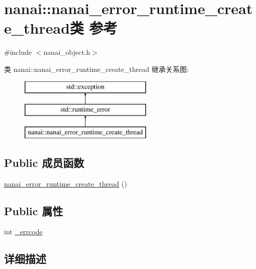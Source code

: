 \hypertarget{classnanai_1_1nanai__error__runtime__create__thread}{}\section{nanai\+:\+:nanai\+\_\+error\+\_\+runtime\+\_\+create\+\_\+thread类 参考}
\label{classnanai_1_1nanai__error__runtime__create__thread}


{\ttfamily \#include $<$nanai\+\_\+object.\+h$>$}

类 nanai\+:\+:nanai\+\_\+error\+\_\+runtime\+\_\+create\+\_\+thread 继承关系图\+:\begin{figure}[H]
\begin{center}
\leavevmode
\includegraphics[height=3.000000cm]{classnanai_1_1nanai__error__runtime__create__thread}
\end{center}
\end{figure}
\subsection*{Public 成员函数}
\begin{DoxyCompactItemize}
\item 
\hyperlink{classnanai_1_1nanai__error__runtime__create__thread_aace42682861730c6af0a207b76b3c329}{nanai\+\_\+error\+\_\+runtime\+\_\+create\+\_\+thread} ()
\end{DoxyCompactItemize}
\subsection*{Public 属性}
\begin{DoxyCompactItemize}
\item 
int \hyperlink{classnanai_1_1nanai__error__runtime__create__thread_abc60a585972bae43ec4d6801097bb5ba}{\+\_\+errcode}
\end{DoxyCompactItemize}


\subsection{详细描述}


